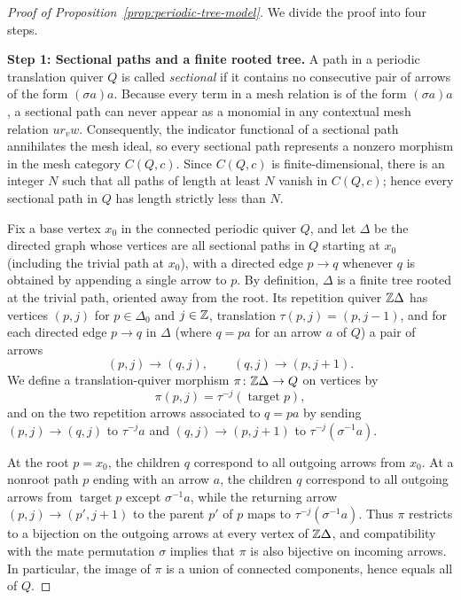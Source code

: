 \begin{proof}[Proof of Proposition~\ref{prop:periodic-tree-model}]
We divide the proof into four steps.

\medskip
\noindent\textbf{Step 1: Sectional paths and a finite rooted tree.}
A path in a periodic translation quiver $Q$ is called \emph{sectional} if it contains no consecutive pair of arrows of the form $(\sigma a)a$. Because every term in a mesh relation is of the form $(\sigma a)a$, a sectional path can never appear as a monomial in any contextual mesh relation $u r_v w$. Consequently, the indicator functional of a sectional path annihilates the mesh ideal, so every sectional path represents a nonzero morphism in the mesh category $C(Q,c)$. Since $C(Q,c)$ is finite-dimensional, there is an integer $N$ such that all paths of length at least $N$ vanish in $C(Q,c)$; hence every sectional path in $Q$ has length strictly less than $N$.

Fix a base vertex $x_0$ in the connected periodic quiver $Q$, and let $\Delta$ be the directed graph whose vertices are all sectional paths in $Q$ starting at $x_0$ (including the trivial path at $x_0$), with a directed edge $p\to q$ whenever $q$ is obtained by appending a single arrow to $p$. By definition, $\Delta$ is a finite tree rooted at the trivial path, oriented away from the root. Its repetition quiver $\mathbb Z\Delta$ has vertices $(p,j)$ for $p\in\Delta_0$ and $j\in\mathbb Z$, translation $\tau(p,j)=(p,j-1)$, and for each directed edge $p\to q$ in $\Delta$ (where $q=pa$ for an arrow $a$ of $Q$) a pair of arrows
\[
  (p,j)\longrightarrow(q,j),\qquad
  (q,j)\longrightarrow(p,j+1).
\]
We define a translation-quiver morphism $\pi\colon\mathbb Z\Delta\to Q$ on vertices by
\[
  \pi(p,j)=\tau^{-j}(\operatorname{target}p),
\]
and on the two repetition arrows associated to $q=pa$ by sending $(p,j)\to(q,j)$ to $\tau^{-j}a$ and $(q,j)\to(p,j+1)$ to $\tau^{-j}(\sigma^{-1}a)$.

At the root $p=x_0$, the children $q$ correspond to all outgoing arrows from $x_0$. At a nonroot path $p$ ending with an arrow $a$, the children $q$ correspond to all outgoing arrows from $\operatorname{target}p$ except $\sigma^{-1}a$, while the returning arrow $(p,j)\to(p',j+1)$ to the parent $p'$ of $p$ maps to $\tau^{-j}(\sigma^{-1}a)$. Thus $\pi$ restricts to a bijection on the outgoing arrows at every vertex of $\mathbb Z\Delta$, and compatibility with the mate permutation $\sigma$ implies that $\pi$ is also bijective on incoming arrows. In particular, the image of $\pi$ is a union of connected components, hence equals all of $Q$.


\end{proof}
